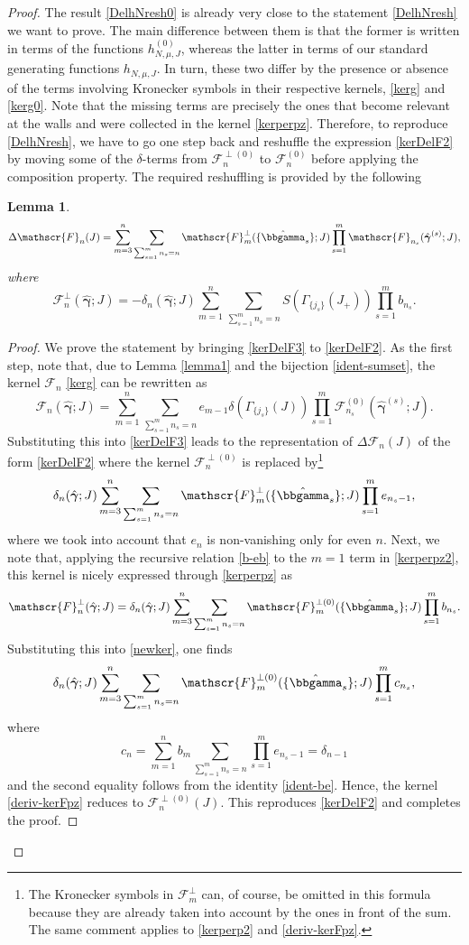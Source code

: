 \documentclass[12pt,letterpaper]{JHEP3}
\def\be{\begin{equation}}
\def\ee{\end{equation}}
\newtheorem{lemma}{Lemma}
\def\Fv{\mathscr{F}}
\newcommand{\bfgam}{{\boldsymbol \gamma}}
\def\bfhgam{\hat\bfgam}
\def\hbbgam{\hat\bbgamma}
\begin{document}
\begin{proof}
The result \eqref{DelhNresh0} is already very close to the statement \eqref{DelhNresh} we want to prove.
The main difference between them is that the former is written in terms of the functions $h^{(0)}_{N,\mu,J}$, 
whereas the latter in terms of our standard generating functions $h_{N,\mu,J}$. 
In turn, these two differ by the presence or absence of the terms
involving Kronecker symbols in their respective kernels, \eqref{kerg} and \eqref{kerg0}.
Note that the missing terms are precisely the ones that become relevant at the walls
and were collected in the kernel \eqref{kerperpz}.
Therefore, to reproduce \eqref{DelhNresh}, we have to go one step back and reshuffle the expression \eqref{kerDelF2}
by moving some of the $\delta$-terms from $\Fv^{\perp(0)}_n$ to $\Fv^{(0)}_n$ before applying the composition property.
The required reshuffling is provided by the following 

\begin{lemma}
\label{lemma-ker}
\be 
\Delta\Fv_n(J)=\sum_{m=3}^n \sum_{\sum_{s=1}^{m} n_s=n}\Fv^\perp_m(\{\hbbgam_s\};J)
\prod_{s=1}^m\Fv_{n_s}(\bfhgam^{(s)};J),
\label{kerDelF3}
\ee 
where
\be 
\Fv^\perp_n(\bfhgam;J)= -\delta_n(\bfhgam;J)
\sum_{m=1}^{n}\sum_{\sum_{s=1}^{m}n_s=n}S(\Gamma_{\{j_s\}}(J_+))
\prod_{s=1}^{m} b_{n_s}.
\label{kerperpz2}
\ee 
\end{lemma}
\begin{proof}
We prove the statement by bringing \eqref{kerDelF3} to \eqref{kerDelF2}.
As the first step, note that, due to Lemma \ref{lemma1} and the bijection \eqref{ident-sumset}, 
the kernel $\Fv_n$ \eqref{kerg} can be rewritten as 
\be
\Fv_n(\bfhgam;J)=\sum_{m=1}^{n}\sum_{\sum_{s=1}^{m}n_s=n} e_{m-1} \delta(\Gamma_{\{j_s\}}(J))
\prod_{s=1}^m\Fv^{(0)}_{n_s}(\bfhgam^{(s)};J).
\label{kerg2}
\ee
Substituting this into \eqref{kerDelF3} leads to the representation of $\Delta\Fv_n(J)$
of the form \eqref{kerDelF2} where the kernel $\Fv^{\perp(0)}_n$ is replaced by\footnote{The Kronecker symbols 
	in $\Fv^\perp_m$ can, of course, be omitted in this formula because they are already taken into account by 
	the ones in front of the sum. The same comment applies to \eqref{kerperp2} and \eqref{deriv-kerFpz}.}
\be 
\delta_n(\bfhgam;J) \sum_{m=3}^n \sum_{\sum_{s=1}^{m} n_s=n}\Fv^\perp_m(\{\hbbgam_s\};J)
\prod_{s=1}^m e_{n_s-1},
\label{newker}
\ee 
where we took into account that $e_n$ is non-vanishing only for even $n$.
Next, we note that, applying the recursive relation \eqref{b-eb} to the $m=1$ term in \eqref{kerperpz2}, 
this kernel is nicely expressed through \eqref{kerperpz} as 
\be 
\Fv^\perp_n(\bfhgam;J)=\delta_n(\bfhgam;J)
\sum_{m=3}^{n}\sum_{\sum_{s=1}^{m}n_s=n}\Fv^{\perp(0)}_m(\{\hbbgam_s\};J)
\prod_{s=1}^{m} b_{n_s}.
\label{kerperp2}
\ee 
Substituting this into \eqref{newker}, one finds 
\be 
\delta_n(\bfhgam;J)
\sum_{m=3}^{n}\sum_{\sum_{s=1}^{m}n_s=n}\Fv^{\perp(0)}_m(\{\hbbgam_s\};J)
\prod_{s=1}^{m} c_{n_s},
\label{deriv-kerFpz}
\ee
where 
\be 
c_n=\sum_{m=1}^{n}b_m\sum_{\sum_{s=1}^{m}n_s=n}
\prod_{s=1}^{m} e_{n_s-1}=\delta_{n-1}
\ee 
and the second equality follows from the identity \eqref{ident-be}.
Hence, the kernel \eqref{deriv-kerFpz} reduces to $\Fv^{\perp(0)}_n(J)$.
This reproduces \eqref{kerDelF2} and completes the proof.
\end{proof}


\end{proof}
\end{document}
